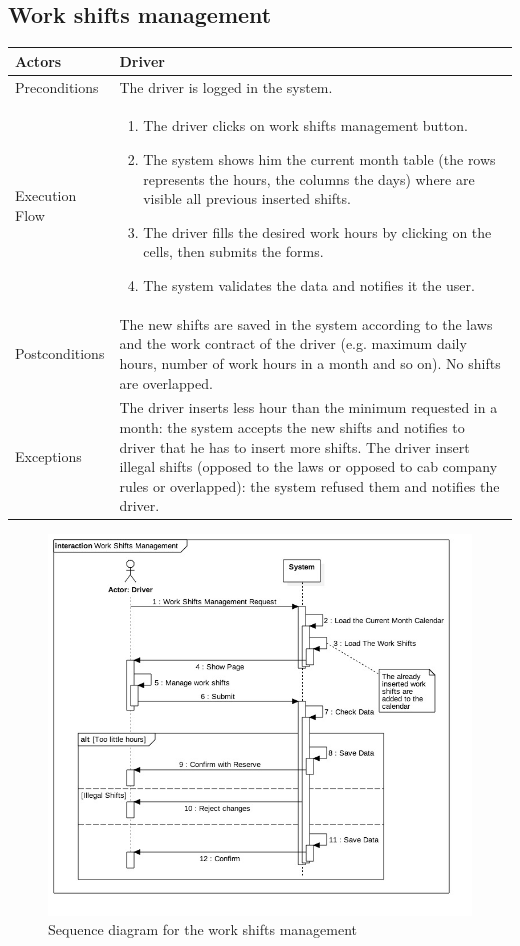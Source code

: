 \subsection{Work shifts management}
\begin{tabular}{lp{8cm}}
	\hline 
	Actors & Driver\\ \hline
	Preconditions & The driver is logged in the system.\\ \hline
	Execution Flow &  \begin{enumerate}
					\item The driver clicks on work shifts management button.
					\item The system shows him the current month table (the rows represents the hours, the columns the days) where are visible all previous inserted shifts.
					\item The driver fills the desired work hours by clicking on the cells, then submits the forms.
					\item The system validates the data and notifies it the user.
					\end{enumerate}
	 \\ \hline
	 Postconditions & The new shifts are saved in the system according to the laws and the work contract of the driver (e.g. maximum daily hours, number of work hours in a month and so on). No shifts are overlapped.\\ \hline
	 Exceptions & The driver inserts less hour than the minimum requested in a month: the system accepts the new shifts and notifies to driver that he has to insert more shifts. The driver insert illegal shifts (opposed to the laws or opposed to cab company rules or overlapped): the system refused them and notifies the driver.  \\ \hline
\end{tabular}

\begin{figure}
	\centerline{\includegraphics[width=\paperwidth]{./figures/SD_WorkShiftsManagement.jpg}}
	\caption{Sequence diagram for the work shifts management}
\end{figure}


